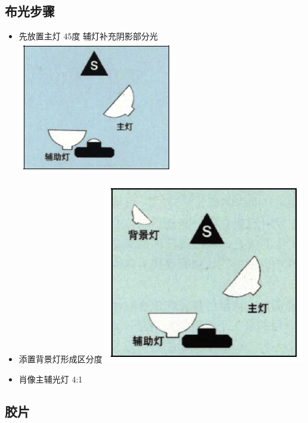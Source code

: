 \documentclass[
  letterpaper,
  DIV=11,
  numbers=noendperiod]{scrreprt}
\providecommand{\tightlist}{%
  \setlength{\itemsep}{0pt}\setlength{\parskip}{0pt}}\usepackage{longtable,booktabs,array}
\begin{document}
\subsection{布光步骤}\label{ux5e03ux5149ux6b65ux9aa4}

\begin{itemize}
\tightlist
\item
  先放置主灯 45度 辅灯补充阴影部分光
  \includegraphics{images/mainlight.png}
\item
  添置背景灯形成区分度 \includegraphics{images/backgroundlight.png}
\item
  肖像主辅光灯 4:1
\end{itemize}

\subsection{胶片}\label{ux80f6ux7247}
\end{document}
